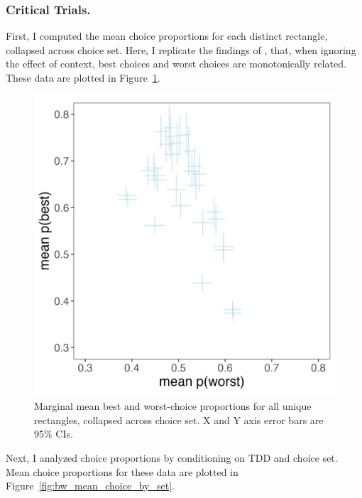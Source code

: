 \subsubsection{Critical Trials.}

First, I computed the mean choice proportions for each distinct rectangle, collapsed across choice set. Here, I replicate the findings of \textcite{hawkinsBestTimesWorst2014}, that, when ignoring the effect of context, best choices and worst choices are monotonically related. These data are plotted in Figure~\ref{fig:bw_marginal}.

\begin{figure}
   \includegraphics[width=\linewidth]{figures/crit_mean_props_marginal.jpeg}
   \caption{Marginal mean best and worst-choice proportions for all unique rectangles, collapsed across choice set. X and Y axis error bars are $95\%$ CIs.}
   \label{fig:bw_marginal}
\end{figure}

Next, I analyzed choice proportions by conditioning on TDD and choice set. Mean choice proportions for these data are plotted in Figure~\ref{fig:bw_mean_choice_by_set}. 

